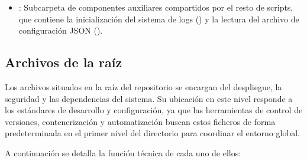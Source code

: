 \begin{itemize}
\begin{itemize}
\begin{itemize}
            \item {}: Archivo principal que orquesta todo el flujo.
            \item {}: Módulo encargado de la extracción de datos desde la API.
            \item {}: Script dedicado a la limpieza y transformación de las reseñas.
            \item {}: Script responsable de la carga de datos en la base de datos.
        \end{itemize}
        \item {}: Subcarpeta de componentes auxiliares compartidos por el resto de scripts, que contiene la inicialización del sistema de logs () y la lectura del archivo de configuración JSON ().
    \end{itemize}
\end{itemize}

\subsection{Archivos de la raíz}

Los archivos situados en la raíz del repositorio se encargan del despliegue, la seguridad y las dependencias del sistema. Su ubicación en este nivel responde a los estándares de desarrollo y configuración, ya que las herramientas de control de versiones, contenerización y automatización buscan estos ficheros de forma predeterminada en el primer nivel del directorio para coordinar el entorno global.

A continuación se detalla la función técnica de cada uno de ellos:

